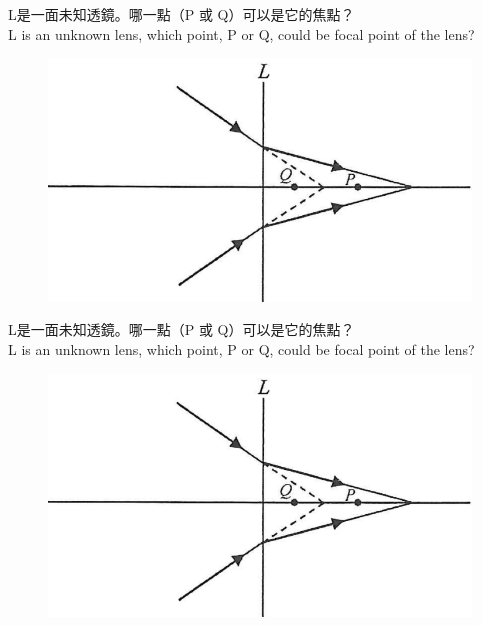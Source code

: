 \documentclass[beamer=true]{standalone}
\begin{document}
\begin{eg}
    L是一面未知透鏡。哪一點（P 或 Q）可以是它的焦點？\\L is an unknown lens, which point, P or Q, could be focal point of the lens?
    \begin{figure}
        \centering
        \includegraphics[width=0.9\linewidth]{assets/djewdineuwdge.png}


    \end{figure}
\end{eg}
\begin{eg}
    L是一面未知透鏡。哪一點（P 或 Q）可以是它的焦點？\\L is an unknown lens, which point, P or Q, could be focal point of the lens?
    \begin{figure}
        \centering
        \includegraphics[width=0.9\linewidth]{assets/djewdineuwdge.png}


    \end{figure}
\end{eg}
\end{document}

